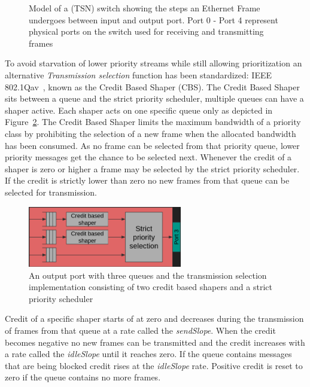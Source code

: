 \begin{figure}[htbp]
	\caption{Model of a (TSN) switch showing the steps an Ethernet Frame undergoes between input and output port. Port 0 - Port 4 represent physical ports on the switch used for receiving and transmitting frames}
	\label{fig:switchinternals}
\end{figure} 
To avoid starvation of lower priority streams while still allowing prioritization an alternative \textit{Transmission selection} function has been standardized: IEEE 802.1Qav~\cite{IEEE8021Qav}, known as the Credit Based Shaper (CBS). The Credit Based Shaper sits between a queue and the strict priority scheduler, multiple queues can have a shaper active. Each shaper acts on one specific queue only as depicted in Figure~\ref{fig:cbs}. The Credit Based Shaper limits the maximum bandwidth of a priority class by prohibiting the selection of a new frame when the allocated bandwidth has been consumed. As no frame can be selected from that priority queue, lower priority messages get the chance to be selected next. Whenever the credit of a shaper is zero or higher a frame may be selected by the strict priority scheduler. If the credit is strictly lower than zero no new frames from that queue can be selected for transmission. 
\begin{figure}[htbp]
    \centering
    \includegraphics[width=0.6\textwidth]{images/cbs.png}
    \caption{An output port with three queues and the transmission selection implementation consisting of two credit based shapers and a strict priority scheduler}
    \label{fig:cbs}
\end{figure}

Credit of a specific shaper starts of at zero and decreases during the transmission of frames from that queue at a rate called the \textit{sendSlope}. When the credit becomes negative no new frames can be transmitted and the credit increases with a rate called the \textit{idleSlope} until it reaches zero. If the queue contains messages that are being blocked credit rises at the \textit{idleSlope} rate. Positive credit is reset to zero if the queue contains no more frames.

